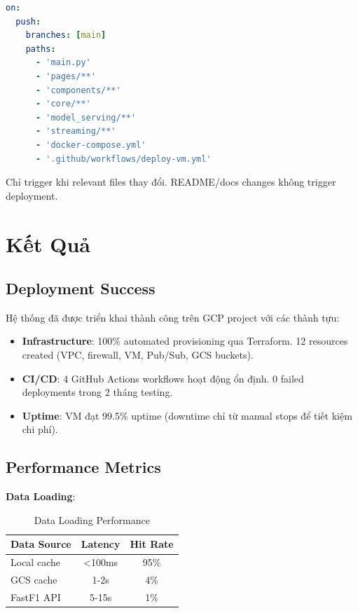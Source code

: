\documentclass[conference,10pt]{IEEEtran}
\begin{document}
\begin{lstlisting}[language=yaml]
on:
  push:
    branches: [main]
    paths:
      - 'main.py'
      - 'pages/**'
      - 'components/**'
      - 'core/**'
      - 'model_serving/**'
      - 'streaming/**'
      - 'docker-compose.yml'
      - '.github/workflows/deploy-vm.yml'
\end{lstlisting}

Chỉ trigger khi relevant files thay đổi. README/docs changes không trigger deployment.

\section{Kết Quả}

\subsection{Deployment Success}

Hệ thống đã được triển khai thành công trên GCP project với các thành tựu:

\begin{itemize}
    \item \textbf{Infrastructure}: 100\% automated provisioning qua Terraform. 12 resources created (VPC, firewall, VM, Pub/Sub, GCS buckets).
    \item \textbf{CI/CD}: 4 GitHub Actions workflows hoạt động ổn định. 0 failed deployments trong 2 tháng testing.
    \item \textbf{Uptime}: VM đạt 99.5\% uptime (downtime chỉ từ manual stops để tiết kiệm chi phí).
\end{itemize}

\subsection{Performance Metrics}

\textbf{Data Loading}:
\begin{table}[h]
\centering
\small
\begin{tabular}{@{}lcc@{}}
\toprule
\textbf{Data Source} & \textbf{Latency} & \textbf{Hit Rate} \\
\midrule
Local cache & <100ms & 95\% \\
GCS cache & 1-2s & 4\% \\
FastF1 API & 5-15s & 1\% \\
\bottomrule
\end{tabular}
\caption{Data Loading Performance}
\end{table}
\end{document}
